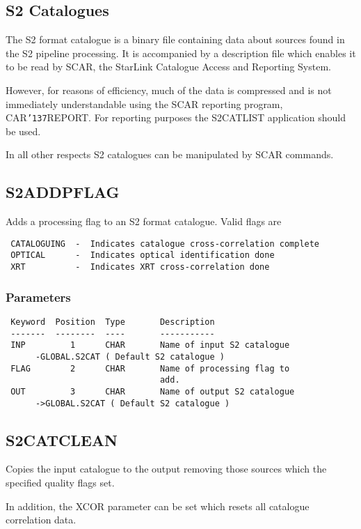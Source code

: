 \documentclass{book}
\renewcommand{\_}{{\tt\char'137}}     %
\begin{document}
\subsection{S2 Catalogues}
The S2 format catalogue is a binary file containing data about sources
found in the S2 pipeline processing. It is accompanied by a description
file which enables it to be read by SCAR, the StarLink Catalogue Access
and Reporting System.

However, for reasons of efficiency, much of the data is compressed and
is not immediately understandable using the SCAR reporting program,
CAR\_REPORT. For reporting purposes the S2CATLIST application should be
used.

In all other respects S2 catalogues can be manipulated by SCAR
commands.

\subsection{S2ADDPFLAG}
Adds a processing flag to an S2 format catalogue. Valid flags are
\begin{verbatim}
 CATALOGUING  -  Indicates catalogue cross-correlation complete
 OPTICAL      -  Indicates optical identification done
 XRT          -  Indicates XRT cross-correlation done
\end{verbatim}
\subsubsection{Parameters}
\begin{verbatim}
 Keyword  Position  Type       Description
 -------  --------  ----       -----------
 INP         1      CHAR       Name of input S2 catalogue
      -GLOBAL.S2CAT ( Default S2 catalogue )
 FLAG        2      CHAR       Name of processing flag to
                               add.
 OUT         3      CHAR       Name of output S2 catalogue
      ->GLOBAL.S2CAT ( Default S2 catalogue )
\end{verbatim}\subsection{S2CATCLEAN}
Copies the input catalogue to the output removing those sources
which the specified quality flags set.

In addition, the XCOR parameter can be set which resets all
catalogue correlation data.
\end{document}
